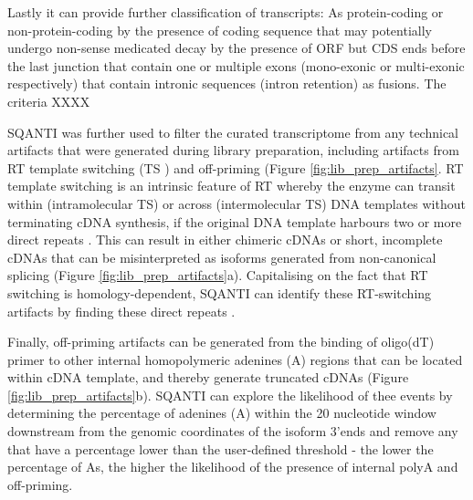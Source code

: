 Lastly it can provide further classification of transcripts:  
As protein-coding or non-protein-coding by the presence of coding sequence
that may potentially undergo non-sense medicated decay by the presence of ORF but CDS ends before the last junction
that contain one or multiple exons (mono-exonic or multi-exonic respectively)
that contain intronic sequences (intron retention) 
as fusions. The criteria XXXX

SQANTI was further used to filter the curated transcriptome from any technical artifacts that were generated during library preparation, including artifacts from RT template switching (TS ) and off-priming \cite{Conesa2016} (Figure \ref{fig:lib_prep_artifacts}. RT template switching is an intrinsic feature of RT whereby the enzyme can transit within (intramolecular TS) or across (intermolecular TS) DNA templates without terminating cDNA synthesis, if the original DNA template harbours two or more direct repeats \cite{Cocquet2006}. This can result in either chimeric cDNAs or short, incomplete cDNAs that can be misinterpreted as isoforms generated from non-canonical splicing \cite{Houseley2010} (Figure \ref{fig:lib_prep_artifacts}a). Capitalising on the fact that RT switching is homology-dependent, SQANTI can identify these RT-switching artifacts by finding these direct repeats \cite{Conesa2016}. 

Finally, off-priming artifacts can be generated from the binding of oligo(dT) primer to other internal homopolymeric adenines (A) regions that can be located within cDNA template, and thereby generate truncated cDNAs \cite{Nam2002} (Figure \ref{fig:lib_prep_artifacts}b). SQANTI can explore the likelihood of thee events by determining the percentage of adenines (A) within the 20 nucleotide window downstream from the genomic coordinates of the isoform 3'ends and remove any that have a percentage lower than the user-defined threshold \cite{Conesa2016} - the lower the percentage of As, the higher the likelihood of the presence of internal polyA and off-priming. 

